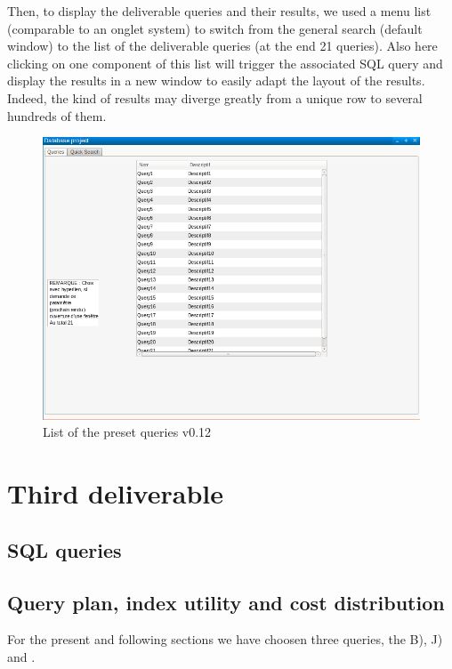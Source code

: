 \documentclass{article}
\begin{document}
Then, to display the deliverable queries and their results, we used a menu list (comparable to an onglet system) to switch from the general search (default window) to the list of the deliverable queries (at the end 21 queries). Also here clicking on one component of this list will trigger the associated SQL query and display the results in a new window to easily adapt the layout of the results. Indeed, the kind of results may diverge greatly from a unique row to several hundreds of them.
\begin{figure}[H]
        \includegraphics[width=\linewidth]{preset_list.png}
        \captionsetup{justification=centering}
        \caption{List of the preset queries v0.12}
    \end{figure}

\section{Third deliverable}

\subsection{SQL queries}

\subsection{Query plan, index utility and cost distribution}

For the present and following sections we have choosen three queries, the B), J) and .\\
\end{document}

